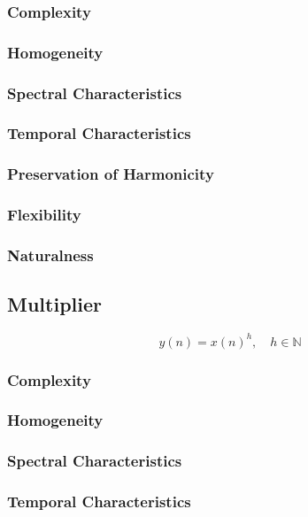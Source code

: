 		\subsubsection*{Complexity}
		\subsubsection*{Homogeneity}
		\subsubsection*{Spectral Characteristics}
		\subsubsection*{Temporal Characteristics}
		\subsubsection*{Preservation of Harmonicity}
		\subsubsection*{Flexibility}
		\subsubsection*{Naturalness}

	\subsection{Multiplier}
	\label{sec:Excitation-Multiplier}
		\begin{equation}
			y(n) = x(n)^{h}, \quad h \in \mathbb{N}
			\label{eq:Multiplier}
		\end{equation}

		\subsubsection*{Complexity}
		\subsubsection*{Homogeneity}
		\subsubsection*{Spectral Characteristics}
		\subsubsection*{Temporal Characteristics}
